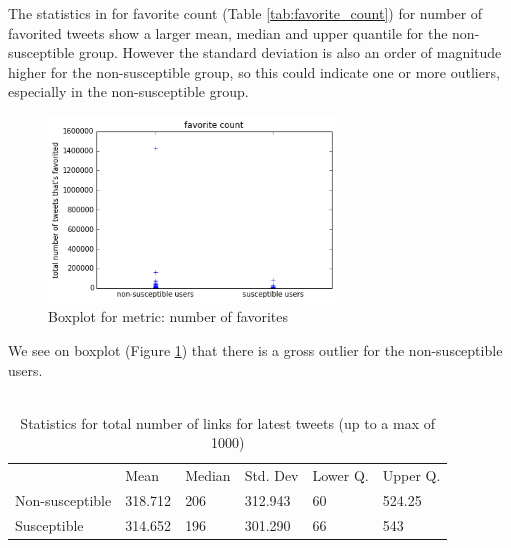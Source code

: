 \documentclass[10pt]{IEEEtran}
\begin{document}
The statistics in for favorite count (Table \ref{tab:favorite_count}) for number of favorited tweets show a larger mean, median and upper quantile for the non-susceptible group. However the standard deviation is also an order of magnitude higher for the non-susceptible group, so this could indicate one or more outliers, especially in the non-susceptible group.
\begin{figure}[H]
  \centering
  \includegraphics[width=3.0in]{favorite_boxplot}
  \caption{Boxplot for metric: number of favorites}
  \label{fig:favorite_boxplot}
\end{figure}
We see on boxplot (Figure \ref{fig:favorite_boxplot}) that there is a gross outlier for the non-susceptible users.\\\\
\begin{table}[ht!]

\begin{tabular}{llllll}
\textbf{}       & Mean    & Median & Std. Dev & Lower Q. & Upper Q. \\
Non-susceptible & 318.712 & 206    & 312.943  & 60       &  524.25  \\
Susceptible     & 314.652 & 196    & 301.290  & 66       &   543  
\end{tabular}
\caption{Statistics for total number of links for latest tweets (up to a max of 1000)}
\label{tab:urls}
\end{table}
\end{document}
